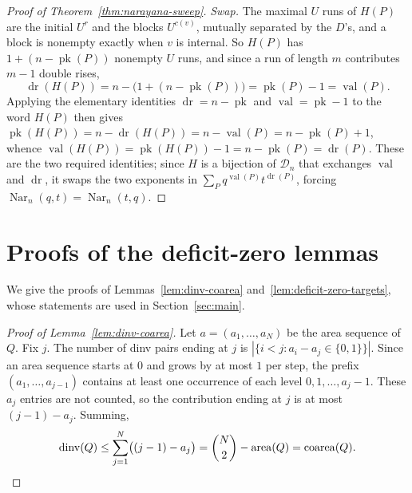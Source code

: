 \documentclass[11pt]{article}
\theoremstyle{definition}
\newcommand{\D}{\mathcal D}
\newcommand{\area}{\operatorname{area}}
\newcommand{\dinv}{\operatorname{dinv}}
\newcommand{\coarea}{\operatorname{coarea}}
\newcommand{\val}{\operatorname{val}}
\newcommand{\dr}{\operatorname{dr}}
\newcommand{\pk}{\operatorname{pk}}
\newcommand{\Nar}{\operatorname{Nar}}
\begin{document}
\begin{proof}[Proof of Theorem~\ref{thm:narayana-sweep}]
\vspace{0.5em}
\noindent\emph{Swap.}  The maximal $U$ runs of $H(P)$ are the initial $U^{r}$ and the
blocks $U^{c(v)}$, mutually separated by the $D$'s, and a block is nonempty
exactly when $v$ is internal.  So $H(P)$ has $1+(n-\pk(P))$ nonempty $U$ runs,
and since a run of length $m$ contributes $m-1$ double rises,
\[
   \dr(H(P))=n-\bigl(1+(n-\pk(P))\bigr)=\pk(P)-1=\val(P).
\]
Applying the elementary identities $\dr=n-\pk$ and $\val=\pk-1$ to the word
$H(P)$ then gives $\pk(H(P))=n-\dr(H(P))=n-\val(P)=n-\pk(P)+1$, whence
$\val(H(P))=\pk(H(P))-1=n-\pk(P)=\dr(P)$.  These are the two required
identities; since $H$ is a bijection of $\D_n$ that exchanges $\val$ and $\dr$,
it swaps the two exponents in $\sum_P q^{\val(P)}t^{\dr(P)}$, forcing
$\Nar_n(q,t)=\Nar_n(t,q)$.
\end{proof}

\section{Proofs of the deficit-zero lemmas}
\label{app:deficit-zero-proofs}

We give the proofs of Lemmas~\ref{lem:dinv-coarea}
and~\ref{lem:deficit-zero-targets}, whose statements are used in
Section~\ref{sec:main}.

\begin{proof}[Proof of Lemma~\ref{lem:dinv-coarea}]
Let $a=(a_1,\ldots,a_N)$ be the area sequence of $Q$.  Fix $j$.  The
number of dinv pairs ending at $j$ is $|\{i<j:a_i-a_j\in\{0,1\}\}|$.
Since an area sequence starts at $0$ and grows by at most $1$ per step,
the prefix $(a_1,\ldots,a_{j-1})$ contains at least one occurrence of each
level $0,1,\ldots,a_j-1$.  These $a_j$ entries are not counted, so the
contribution ending at $j$ is at most $(j-1)-a_j$.  Summing,
\[
   \dinv(Q)\le\sum_{j=1}^N\bigl((j-1)-a_j\bigr)
            =\binom N2-\area(Q)
            =\coarea(Q). \qedhere
\]
\end{proof}
\end{document}
